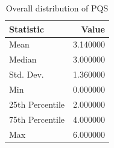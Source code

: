 \begin{table}
\caption{Overall distribution of PQS}
\label{tab:pqs-distribution}
\begin{tabular}{lr}
\toprule
Statistic & Value \\
\midrule
Mean & 3.140000 \\
Median & 3.000000 \\
Std. Dev. & 1.360000 \\
Min & 0.000000 \\
25th Percentile & 2.000000 \\
75th Percentile & 4.000000 \\
Max & 6.000000 \\
\bottomrule
\end{tabular}
\end{table}
